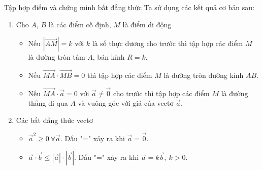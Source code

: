 \begin{dang}{Tập hợp điểm và chứng minh bất đẳng thức}
	Ta sử dụng các kết quả cơ bản sau:\\
	\begin{enumerate}
		\item Cho $A$, $B$ là các điểm cố định, $M$ là điểm di động
		      \begin{itemize}
			      \item Nếu $\left| \overrightarrow{AM} \right|=k$ với $k$ là số thực dương cho trước thì tập hợp các điểm $M$ là đường tròn tâm $A$, bán kính $R=k$.
			      \item Nếu $\overrightarrow{MA}\cdot \overrightarrow{MB}=0$ thì tập hợp các điểm $M$ là đường tròn đường kính $AB$.
			      \item Nếu $\overrightarrow{MA}\cdot \overrightarrow{a}=0$ với $\overrightarrow{a}\neq \overrightarrow{0}$ cho trước thì tập hợp các điểm $M$ là đường thẳng đi qua $A$ và vuông góc với giá của vectơ $\overrightarrow{a}$.
		      \end{itemize}
		\item Các bất đẳng thức vectơ
		      \begin{itemize}
			      \item $\overrightarrow{a}^2\geq 0\ \forall \overrightarrow{a}$. Dấu "=" xảy ra khi $\overrightarrow{a}=\overrightarrow{0}$.
			      \item $\overrightarrow{a}\cdot \overrightarrow{b}\leq |\overrightarrow{a}|\cdot |\overrightarrow{b}|$. Dấu "=" xảy ra khi $\overrightarrow{a}=k\overrightarrow{b},\ k>0$.
		      \end{itemize}
	\end{enumerate}
\end{dang}
